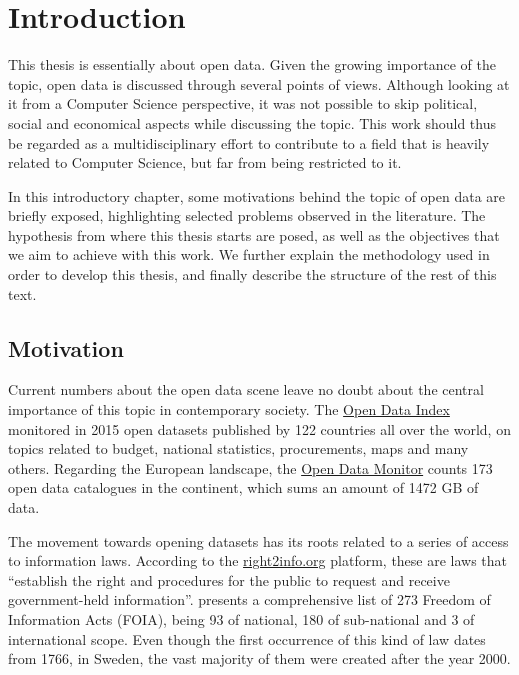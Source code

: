 \chapter{Introduction}

This thesis is essentially about open data.
Given the growing importance of the topic, open data is discussed through several points of views.
Although looking at it from a Computer Science perspective, it was not possible to skip political, social and economical aspects while discussing the topic.
This work should thus be regarded as a multidisciplinary effort to contribute to a field that is heavily related to Computer Science, but far from being restricted to it.

In this introductory chapter, some motivations behind the topic of open data are briefly exposed, highlighting selected problems observed in the literature.
The hypothesis from where this thesis starts are posed, as well as the objectives that we aim to achieve with this work.
We further explain the methodology used in order to develop this thesis, and finally describe the structure of the rest of this text.

\section{Motivation}
Current numbers about the open data scene leave no doubt about the central importance of this topic in contemporary society.
The \href{http://index.okfn.org/place/}{Open Data Index} monitored in 2015 open datasets published by 122 countries all over the world, on topics related to budget, national statistics, procurements, maps and many others.
Regarding the European landscape, the \href{http://opendatamonitor.eu/}{Open Data Monitor} counts 173 open data catalogues in the continent, which sums an amount of 1472 GB of data.

The movement towards opening datasets has its roots related to a series of access to information laws. 
According to the \href{http://right2info.org}{right2info.org} platform, these are laws that ``establish the right and procedures for the public to request and receive government-held information''.
 presents a comprehensive list of 273 Freedom of Information Acts (FOIA), being 93 of national, 180 of sub-national and 3 of international scope.
Even though the first occurrence of this kind of law dates from 1766, in Sweden, the vast majority of them were created after the year 2000.

